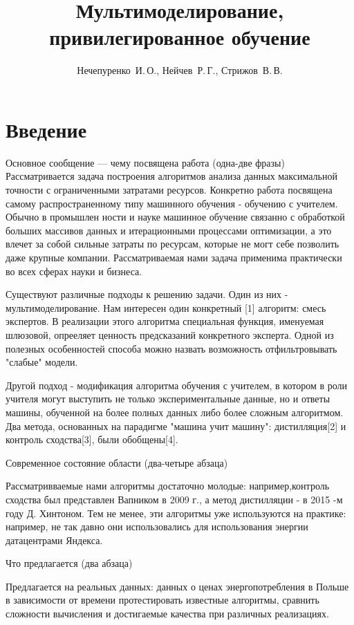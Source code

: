 \documentclass[12pt,twoside]{article}
\title
    [Образец оформления статьи для публикации] %
    {Мультимоделирование, привилегированное обучение}
\author
    [Нечепуренко~И.\,О.] %
    {Нечепуренко~И.\,О., Нейчев~Р.\,Г., Стрижов~В.\,В.} %
    [Нечепуренко~И.\,О.$^1$, Нейчев~Р.\,Г.$^2$, Стрижов~В.\,В.$^2$] %
\begin{document}
\maketitle
\section{Введение}

Основное сообщение — чему посвящена работа (одна-две фразы)
Рассматривается задача построения алгоритмов анализа данных максимальной точности с ограниченными затратами ресурсов. Конкретно работа посвящена самому распространенному типу машинного обучения - обучению с учителем. Обычно в промышлен ности и науке машинное обучение связанно с обработкой больших массивов данных и итерационными процессами оптимизации, а это влечет за собой сильные затраты по ресурсам, которые не могт себе позволить даже крупные компании. Рассматриваемая нами задача применима практически во всех сферах науки и бизнеса.

Существуют различные подходы к решению задачи. Один из них - мультимоделирование. Нам интересен один конкретный [1] алгоритм: смесь экспертов. В реализации этого алгоритма специальная функция, именуемая шлюзовой, опрееляет ценность предсказаний конкретного эксперта. Одной из полезных особенностей способа можно назвать возможность отфильтровывать "слабые" модели. 

Другой подход - модификация алгоритма обучения с учителем, в котором в роли учителя могут выступить не только экспериментальные данные, но и ответы машины, обученной на более полных данных либо более сложным алгоритмом.
Два метода, основанных на парадигме "машина учит машину":  дистилляция[2] и контроль сходства[3], были обобщены[4].


Современное состояние области (два-четыре абзаца)

Рассматривваемые нами алгоритмы достаточно молодые: например,контроль сходства был представлен Вапником в 2009 г., а метод дистилляции - в 2015 -м году Д. Хинтоном.  Тем не менее, эти алгоритмы уже используются на практике: например, не так давно они использовались для использования энергии датацентрами Яндекса. 


Что предлагается (два абзаца)

Предлагается на реальных данных: данных о ценах энергопотребления в Польше в зависимости от времени протестировать известные алгоритмы, сравнить сложности вычисления и достигаемые качества при различных  реализациях.
\end{document}

